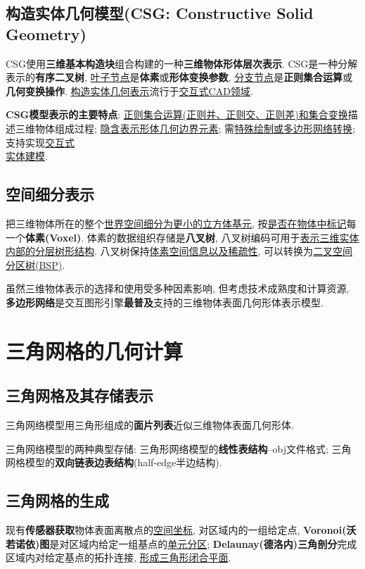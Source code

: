 \documentclass[12pt, a4paper, oneside]{ctexart}
\def\ul{\underline}         %
\def\bf{\textbf}            %
\begin{document}
\subsection{构造实体几何模型(CSG: Constructive Solid Geometry)}
CSG使用\bf{三维基本构造块}组合构建的一种\bf{三维物体形体层次表示}. CSG是一种分解表示的\bf{有序二叉树}, \ul{叶子节点}是\bf{体素}或\bf{形体变换参数}, \ul{分支节点}是\bf{正则集合运算}或\bf{几何变换操作}. \ul{构造实体几何表示}流行于\ul{交互式CAD领域}.

\bf{CSG模型表示的主要特点}: \ul{正则集合运算(正则并、正则交、正则差)和集合变换}描述三维物体组成过程; \ul{隐含表示形体几何边界元素}; 需\ul{特殊绘制或多边形网络转换}; 支持实现\ul{交互式}\\\ul{实体建模}.

\subsection{空间细分表示}
把三维物体所在的整个\ul{世界空间细分为更小的立方体基元}, 按\ul{是否在物体中标记}每一个\bf{体素(Voxel)}. 体素的数据组织存储是\bf{八叉树}, 八叉树编码可用于\ul{表示三维实体内部的分层树形结构}. 八叉树保持\ul{体素空间信息以及稀疏性}, 可以转换为\ul{二叉空间分区树(BSP)}.

虽然三维物体表示的选择和使用受多种因素影响, 但考虑技术成熟度和计算资源, \bf{多边形网络}是交互图形引擎\bf{最普及}支持的三维物体表面几何形体表示模型.

\section{三角网格的几何计算}
\subsection{三角网格及其存储表示}
三角网络模型用三角形组成的\bf{面片列表}近似三维物体表面几何形体.

三角网络模型的两种典型存储: 三角形网络模型的\bf{线性表结构}--obj文件格式; 三角网格模型的\bf{双向链表边表结构}(half-edge半边结构).

\subsection{三角网格的生成}

现有\bf{传感器获取}物体表面离散点的\ul{空间坐标}, 对区域内的一组给定点, \bf{Voronoi(沃若诺依)图}是对区域内给定一组基点的\ul{单元分区}; \bf{Delaunay(德洛内)三角剖分}完成区域内对给定基点的拓扑连接, \ul{形成三角形闭合平面}.
\end{document}
